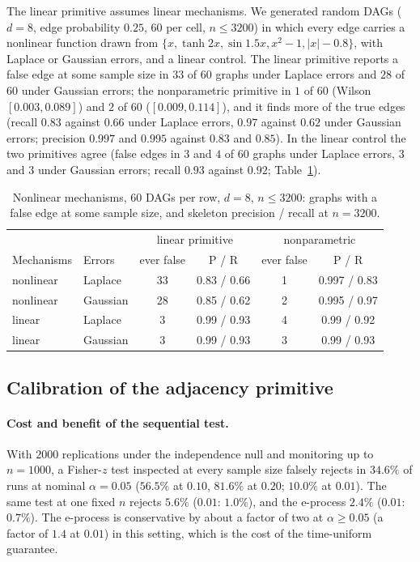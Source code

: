 The linear primitive assumes linear mechanisms. We generated random DAGs
($d=8$, edge probability $0.25$, $60$ per cell, $n\le3200$) in which every edge
carries a nonlinear function drawn from $\{x,\tanh 2x,\sin 1.5x,x^2-1,|x|-0.8\}$,
with Laplace or Gaussian errors, and a linear control. The
linear primitive reports a false edge at some sample size in $33$ of $60$ graphs
under Laplace errors and $28$ of $60$ under Gaussian errors; the nonparametric
primitive in $1$ of $60$ (Wilson $[0.003,0.089]$) and $2$ of $60$
($[0.009,0.114]$), and it finds more of the true edges (recall $0.83$ against
$0.66$ under Laplace errors, $0.97$ against $0.62$ under Gaussian errors; precision
$0.997$ and $0.995$ against $0.83$ and $0.85$). In the linear control the two
primitives agree (false edges in $3$ and $4$ of $60$ graphs under Laplace errors,
$3$ and $3$ under Gaussian errors; recall $0.93$ against $0.92$; Table~\ref{tab:nonlinear}).

\begin{table}[t]
\caption{Nonlinear mechanisms, $60$ DAGs per row, $d=8$, $n\le3200$: graphs with a
false edge at some sample size, and skeleton precision / recall at $n=3200$.}
\label{tab:nonlinear}
\small
\begin{tabular}{@{}llcccc@{}}
\toprule
 & & \multicolumn{2}{c}{linear primitive} & \multicolumn{2}{c}{nonparametric}\\
Mechanisms & Errors & ever false & P / R & ever false & P / R\\
\midrule
nonlinear & Laplace & 33 & 0.83 / 0.66 & 1 & 0.997 / 0.83\\
nonlinear & Gaussian & 28 & 0.85 / 0.62 & 2 & 0.995 / 0.97\\
linear & Laplace & 3 & 0.99 / 0.93 & 4 & 0.99 / 0.92\\
linear & Gaussian & 3 & 0.99 / 0.93 & 3 & 0.99 / 0.93\\
\bottomrule
\end{tabular}
\end{table}

\subsection{Calibration of the adjacency primitive}
\label{sec:exp-primitive}

\paragraph{Cost and benefit of the sequential test.} With $2000$ replications
under the independence null and monitoring up to $n=1000$, a Fisher-$z$ test
inspected at every sample size falsely rejects in $34.6\%$ of runs at nominal
$\alpha=0.05$ ($56.5\%$ at $0.10$, $81.6\%$ at $0.20$; $10.0\%$ at $0.01$). The
same test at one fixed $n$ rejects $5.6\%$ ($0.01$: $1.0\%$), and the e-process
$2.4\%$ ($0.01$: $0.7\%$). The e-process is conservative by about a factor of two
at $\alpha\ge0.05$ (a factor of $1.4$ at $0.01$) in this setting, which is the cost
of the time-uniform guarantee.

